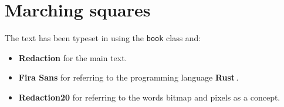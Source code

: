 \documentclass[12pt,openany,a4,usenames,dvipsnames]{book}
\newcommand\bitmap{{\pixelfont{}bitmap}}
\newcommand\pixels{{\pixelfont{}pixels}}
\newcommand\Rust{{\fira{}\textbf{Rust}}}
\begin{document}
\chapter{Marching squares}
\skelpar%
\clearpage{}
\stopthumb
\backmatter
{}
\cleardoublepage
\printindex
\cleardoublepage
{}
\thispagestyle{empty}
\colophontitlesize{25pt}
\begin{colophon}
\noindent{}The text has been typeset in {\cm{}\XeLaTeX{}} using the \texttt{book} class and:
\begin{itemize}
  \item \textbf{Redaction} for the main text.
  \item \textbf{\fira{}Fira Sans} for referring to the programming language \Rust{}\,.
  \item \textbf{\pixelfont{}Redaction20} for referring to the words \bitmap{} and \pixels{} as a concept.
\end{itemize}
\end{colophon}
\clearpage{}
\listoftodos{}
\end{document}
